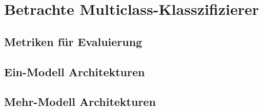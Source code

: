 \section{Betrachte Multiclass-Klasszifizierer}

\subsection{Metriken für Evaluierung}

\subsection{Ein-Modell Architekturen}

\subsection{Mehr-Modell Architekturen}